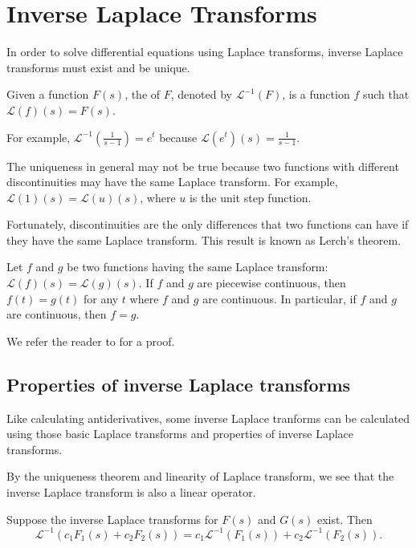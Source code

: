 \section{Inverse Laplace Transforms}

In order to solve differential equations using Laplace transforms, inverse Laplace transforms must exist and be unique.

\begin{definition}
  Given a function $F(s)$, the  of $F$, denoted by $\mathcal{L}^{-1}(F)$, is a function $f$ such that $\mathcal{L}(f)(s)=F(s)$.
\end{definition}

For example, $\mathcal{L}^{-1}\left(\frac{1}{s-1}\right)=e^{t}$ because $\mathcal{L}(e^t)(s)=\frac{1}{s-1}$.


The uniqueness in general may not be true because two functions with different discontinuities may have the same Laplace transform. For example, $\mathcal{L}(1)(s)=\mathcal{L}(u)(s)$, where $u$ is the unit step function.

Fortunately, discontinuities are the only differences that two functions can have if they have the same Laplace transform. This result is known as Lerch's theorem.

\begin{theorem}
  Let $f$ and $g$ be two functions having the same Laplace transform: $\mathcal{L}(f)(s)=\mathcal{L}(g)(s)$. 
  If $f$ and $g$ are piecewise continuous, then $f(t)=g(t)$ for any $t$ where $f$ and $g$ are continuous.
  In particular, if $f$ and $g$ are continuous, then $f=g$.
\end{theorem}

We refer the reader to \autocite[Chapter 5]{Doetsch1974} for a proof.

\subsection*{Properties of inverse Laplace transforms}

Like calculating antiderivatives, some inverse Laplace tranforms can be calculated using those basic Laplace transforms and properties of inverse Laplace transforms. 

By the uniqueness theorem and linearity of Laplace transform, we see that the inverse Laplace transform is also a linear operator.

\begin{theorem}
  Suppose the inverse Laplace transforms for $F(s)$ and $G(s)$ exist. Then
  \[\mathcal{L}^{-1}(c_1F_1(s)+c_2F_2(s))=c_1\mathcal{L}^{-1}(F_1(s))+c_2\mathcal{L}^{-1}(F_2(s)).\]
\end{theorem}

